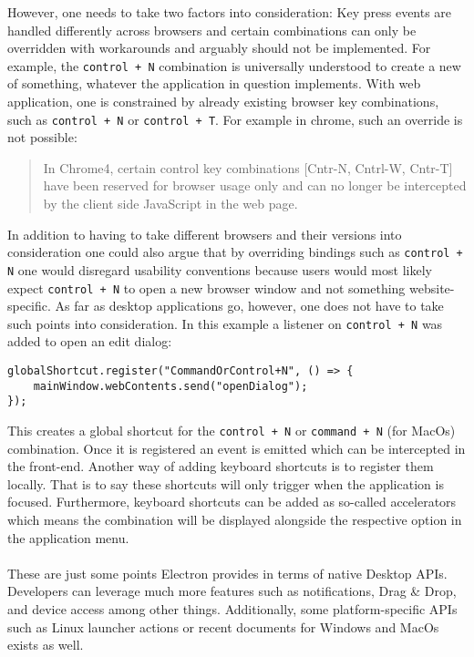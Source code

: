 However, one needs to take two factors into consideration:
Key press events are handled differently across browsers and certain combinations can only be 
overridden with workarounds and arguably should not be implemented. \parencite{mdnKeyboardEvent}
For example, the \lstinline[columns=fixed]{control + N} combination is universally understood to create 
a new of something, whatever the application in question implements.
With web application, one is constrained by already existing browser key combinations, such as \lstinline[columns=fixed]{control + N} or 
\lstinline[columns=fixed]{control + T}.
For example in chrome, such an override is not possible:
\blockquote{In Chrome4, certain control key combinations [Cntr-N, Cntrl-W, Cntr-T] have been reserved for browser 
usage only and can no longer be intercepted by the client side JavaScript 
in the web page.}
\parencite{chromeIssueTrackerV4}
In addition to having to take different browsers and their versions into consideration one could also argue
that by overriding bindings such as \lstinline[columns=fixed]{control + N} one would disregard usability
conventions because users would most likely expect \lstinline[columns=fixed]{control + N} to open a new 
browser window and not something website-specific. 
As far as desktop applications go, however, one does not have to take such points into consideration.
In this example a listener on \lstinline[columns=fixed]{control + N} was added to open an edit dialog:
\begin{lstlisting}[caption=Enabling the custom menu.]
globalShortcut.register("CommandOrControl+N", () => {
    mainWindow.webContents.send("openDialog");
});
\end{lstlisting}
This creates a global shortcut for the \lstinline[columns=fixed]{control + N} or \lstinline[columns=fixed]{command + N} 
(for MacOs) combination. 
Once it is registered an event is emitted which can be intercepted in the front-end. 
Another way of adding keyboard shortcuts is to register them locally. 
That is to say these shortcuts will only trigger when the application is focused. \parencite{electronKeyboardShortcuts}
Furthermore, keyboard shortcuts can be added as so-called accelerators which means the combination will
be displayed alongside the respective option in the application menu. \paragraph{}
These are just some points Electron provides in terms of native Desktop APIs. 
Developers can leverage much more features such as notifications, Drag \& Drop, and device access among other things.
Additionally, some platform-specific APIs such as Linux launcher actions or recent documents for Windows and MacOs
exists as well.